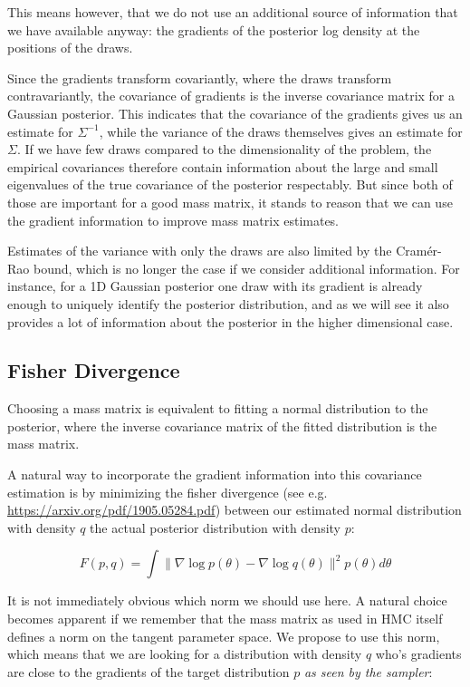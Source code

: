 \documentclass{scrartcl}
\begin{document}
This means however, that we do not use an additional source of information that
we have available anyway: the gradients of the posterior log density at the
positions of the draws.

Since the gradients transform covariantly, where the draws transform
contravariantly, the covariance of gradients is the inverse covariance matrix
for a Gaussian posterior. This indicates that the covariance of the gradients
gives us an estimate for $\Sigma^{-1}$, while the variance of the draws
themselves gives an estimate for $\Sigma$. If we have few draws compared to the
dimensionality of the problem, the empirical covariances therefore contain
information about the large and small eigenvalues of the true covariance of the
posterior respectably. But since both of those are important for a good mass
matrix, it stands to reason that we can use the gradient information to improve
mass matrix estimates.

Estimates of the variance with only the draws are also limited by the
Cramér-Rao bound, which is no longer the case if we consider additional
information. For instance, for a 1D Gaussian posterior one draw with its
gradient is already enough to uniquely identify the posterior distribution, and
as we will see it also provides a lot of information about the posterior in the
higher dimensional case.

\subsection{Fisher Divergence}

Choosing a mass matrix is equivalent to fitting a normal distribution to the
posterior, where the inverse covariance matrix of the fitted distribution is
the mass matrix.

A natural way to incorporate the gradient information into this covariance
estimation is by minimizing the fisher divergence (see e.g.
\url{https://arxiv.org/pdf/1905.05284.pdf}) between our estimated normal
distribution with density $q$ the actual posterior distribution with density
$p$:

\[
  F(p, q)
    = \int \lVert \nabla \log p(\theta)
      - \nabla \log q(\theta)\rVert^2 p(\theta)d\theta
\]

It is not immediately obvious which norm we should use here. A natural choice
becomes apparent if we remember that the mass matrix as used in HMC itself
defines a norm on the tangent parameter space. We propose to use this norm,
which means that we are looking for a distribution with density $q$ who's
gradients are close to the gradients of the target distribution $p$ \emph{as
seen by the sampler}:
\end{document}
